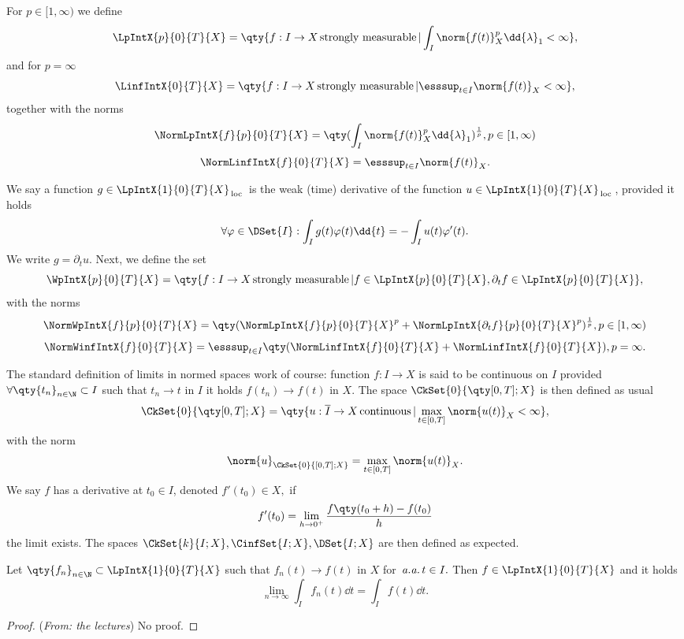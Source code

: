 \begin{definition}
 
	For $p \in [1, \infty)$ we define
	\[
		\LpIntX{p}{0}{T}{X} = \qty{f: I \to X \, \text{strongly measurable} \,| \int_I \norm{f(t)}_X^p\dd{\lambda}_1 < \infty},
	\]
	and for $p = \infty$
	\[
		\LinfIntX{0}{T}{X} = \qty{f: I \to X \, \text{strongly measurable} \,| \esssup_{t \in I}\norm{f(t)}_X < \infty},
	\]
	together with the norms
	\[
		\NormLpIntX{f}{p}{0}{T}{X} = \qty(\int_I \norm{f(t)}_X^p \dd{\lambda}_1)^{\frac{1}{p}}, p \in [1, \infty)
	\]
	\[
		\NormLinfIntX{f}{0}{T}{X} = \esssup_{t \in I} \norm{f(t)}_X.
	\]

	We say a function $g \in \LpIntX{1}{0}{T}{X}_{\, \text{loc} \,}$  is the weak (time) derivative of the function $u \in \LpIntX{1}{0}{T}{X}_{\, \text{loc} \,}$, provided it holds
	\[
		\forall \varphi \in \DSet{I}: \int_I g(t) \varphi(t) \dd{t} = - \int_I u(t) \varphi'(t).
	\]
	We write $g = \partial_t u.$
	Next, we define the set
	\[
		\WpIntX{p}{0}{T}{X} = \qty{f: I \to X \, \text{strongly measurable} \,| f \in \LpIntX{p}{0}{T}{X}, \partial_t f \in \LpIntX{p}{0}{T}{X}},
	\]
	with the norms
	\[
		\NormWpIntX{f}{p}{0}{T}{X} = \qty(\NormLpIntX{f}{p}{0}{T}{X}^p + \NormLpIntX{\partial_t f}{p}{0}{T}{X}^p)^{\frac{1}{p}}, p \in [1, \infty)
	\]
	\[
		\NormWinfIntX{f}{0}{T}{X} = \esssup_{t \in I}\qty(\NormLinfIntX{f}{0}{T}{X} + \NormLinfIntX{f}{0}{T}{X}), p = \infty.
	\]
	
\end{definition}
\begin{definition}
	The standard definition of limits in normed spaces work of course: function $f: I \to X$ is said to be continuous on $I$ provided $\forall \qty{t_n}_{n \in \N} \subset I$ such that $t_n \to t$ in $I$ it holds $f(t_n) \to f(t)$ in $X$. The space $\CkSet{0}{\qty[0,T];X}$ is then defined as usual
	\[
		\CkSet{0}{\qty[0,T];X} = \qty{u: \overline{I} \to X \, \text{continuous} \,| \max_{t \in [0,T]} \norm{u(t)}_X < \infty},
	\]
	with the norm
	\[
		\norm{u}_{\CkSet{0}{[0,T];X}} = \max_{t \in [0,T]} \norm{u(t)}_X.
	\]
	We say $f$ has a derivative at $t_0 \in I$, denoted $f'(t_0) \in X, $ if
	\[
		f'(t_0) = \lim_{h \to 0^+}\frac{f\qty(t_0 +h) -  f(t_0)}{h}
	\]
	the limit exists.
	The spaces $\CkSet{k}{I;X}, \CinfSet{I;X}, \DSet{I;X}$ are then defined as expected.
\end{definition}

\begin{lemma}
	Let $\qty{f_n}_{n \in \N} \subset \LpIntX{1}{0}{T}{X}$ such that $f_n(t) \to f(t)$ in $X$ for $\, \text{\textit{a.a.}} \, t \in I.$ Then $f \in \LpIntX{1}{0}{T}{X}$ and it holds
	\[
		\lim_{n \to \infty}\int_I f_n(t) \dd{t} = \int_I f(t) \dd{t}.
	\]
\end{lemma}
\begin{proof}(\textit{From: the lectures})
    No proof.
\end{proof}

